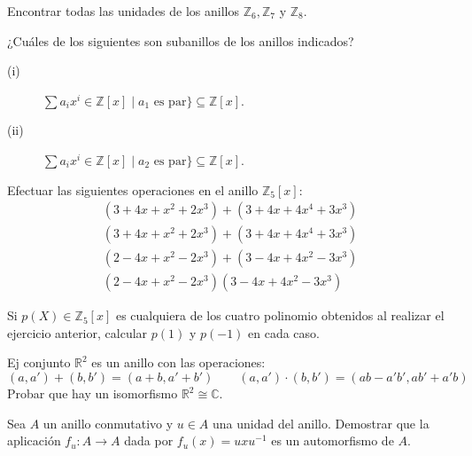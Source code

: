 \begin{ejercicio}
    Encontrar todas las unidades de los anillos $\mathbb{Z}_6, \mathbb{Z}_7$ y $\mathbb{Z}_8$.
\end{ejercicio}

\begin{ejercicio}
    ¿Cuáles de los siguientes son subanillos de los anillos indicados?
    \begin{description}
        \item [(i)] $\sum a_i x^i \in \mathbb{Z}[x] \mid a_1 \text{\ es\ par}\} \subseteq \mathbb{Z}[x]$.
        \item [(ii)] $\sum a_i x^i \in \mathbb{Z}[x] \mid a_2 \text{\ es\ par}\} \subseteq \mathbb{Z}[x]$.
    \end{description}
\end{ejercicio}

\begin{ejercicio}
    Efectuar las siguientes operaciones en el anillo $\mathbb{Z}_5[x]$:
    \begin{gather*}
        (3+4x+x^2+2x^3) + (3+4x+4x^4 + 3x^3) \\
        (3+4x+x^2+2x^3) + (3+4x+4x^4 + 3x^3) \\
        (2-4x+x^2-2x^3) + (3-4x+4x^2-3x^3) \\
        (2-4x+x^2-2x^3) (3-4x+4x^2-3x^3) 
    \end{gather*}
\end{ejercicio}

\begin{ejercicio}
    Si $p(X)\in \mathbb{Z}_5[x]$ es cualquiera de los cuatro polinomio obtenidos al realizar el ejercicio anterior, calcular $p(1)$ y $p(-1)$ en cada caso.
\end{ejercicio}

\begin{ejercicio}
    Ej conjunto $\mathbb{R}^2$ es un anillo con las operaciones:
    \begin{equation*}
        (a,a')+(b,b') = (a+b,a'+b') \qquad (a,a')\cdot (b,b') = (ab-a'b', ab'+a'b)
    \end{equation*}
    Probar que hay un isomorfismo $\mathbb{R}^2\cong \mathbb{C}$.
\end{ejercicio}

\begin{ejercicio}
    Sea $A$ un anillo conmutativo y $u\in A$ una unidad del anillo. Demostrar que la aplicación $f_u:A\to A$ dada por $f_u(x) = uxu^{-1}$ es un automorfismo de $A$.
\end{ejercicio}

